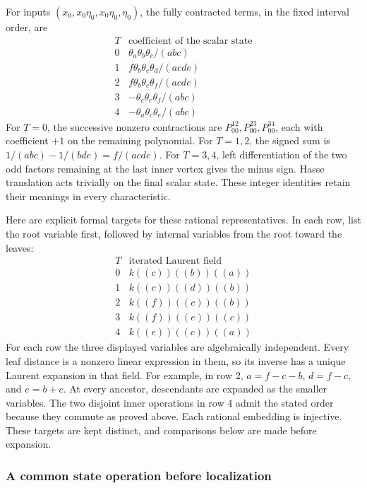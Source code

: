 \begin{example}
For inputs \((x_0,x_0\eta_0,x_0\eta_0,\eta_0)\), the fully
contracted terms, in the fixed interval order, are
\[
 \begin{array}{c|c}
 T&\text{coefficient of the scalar state}\\\hline
 0&\theta_a\theta_b\theta_c/(abc)\\
 1&f\theta_b\theta_c\theta_d/(acde)\\
 2&f\theta_b\theta_c\theta_f/(acde)\\
 3&-\theta_c\theta_e\theta_f/(abc)\\
 4&-\theta_a\theta_c\theta_e/(abc)
 \end{array}
\]
For \(T=0\), the successive nonzero contractions are
\(P^{12}_{00},P^{23}_{00},P^{34}_{00}\), each with coefficient
\(+1\) on the remaining polynomial.  For \(T=1,2\), the
signed sum is \(1/(abc)-1/(bde)=f/(acde)\).
For \(T=3,4\), left differentiation of the two odd factors
remaining at the last inner vertex gives the minus sign.
Hasse translation acts trivially on the final scalar state.
These integer identities retain their meanings in every characteristic.
\end{example}

Here are explicit formal targets for these rational representatives.
In each row, list the root variable first, followed by internal
variables from the root toward the leaves:
\[
 \begin{array}{c|c}
 T&\text{iterated Laurent field}\\\hline
 0&k((c))((b))((a))\\
 1&k((c))((d))((b))\\
 2&k((f))((c))((b))\\
 3&k((f))((e))((c))\\
 4&k((e))((c))((a))
 \end{array}
\]
For each row the three displayed variables are algebraically independent.
Every leaf distance is a nonzero linear expression in them, so its
inverse has a unique Laurent expansion in that field.  For example,
in row 2, \(a=f-c-b\), \(d=f-c\), and \(e=b+c\).
At every ancestor, descendants are expanded as the smaller variables.
The two disjoint inner operations in row 4 admit the stated order
because they commute as proved above.  Each rational embedding is
injective.  These targets are kept distinct, and comparisons below
are made before expansion.

\subsubsection{A common state operation before localization}

